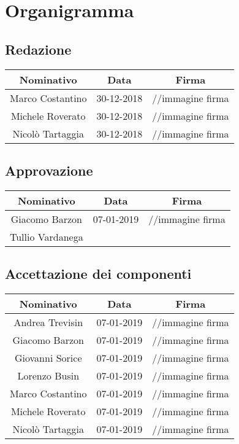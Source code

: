 \section*{Organigramma}

\subsection*{Redazione}
\begin{center}
  \begin{tabular}{ c | c | c }
    \hline
    \textbf{Nominativo} & \textbf{Data} & \textbf{Firma} \\ \hline
    Marco Costantino & 30-12-2018 & //immagine firma \\ \hline
    Michele Roverato & 30-12-2018 & //immagine firma \\ \hline
    Nicolò Tartaggia & 30-12-2018 & //immagine firma \\ 
    \hline
  \end{tabular}
\end{center}

\subsection*{Approvazione}
\begin{center}
  \begin{tabular}{ c | c | c }
    \hline
    \textbf{Nominativo} & \textbf{Data} & \textbf{Firma} \\ \hline
    Giacomo Barzon & 07-01-2019 & //immagine firma \\ \hline
    Tullio Vardanega &  &  \\
    \hline
  \end{tabular}
\end{center}

\subsection*{Accettazione dei componenti}
\begin{center}
  \begin{tabular}{ c | c | c }
    \hline
    \textbf{Nominativo} & \textbf{Data} & \textbf{Firma} \\ \hline
    Andrea Trevisin & 07-01-2019 & //immagine firma \\ \hline
    Giacomo Barzon & 07-01-2019 & //immagine firma \\ \hline
    Giovanni Sorice & 07-01-2019 & //immagine firma \\ \hline
    Lorenzo Busin & 07-01-2019 & //immagine firma \\ \hline
    Marco Costantino & 07-01-2019 & //immagine firma \\ \hline
    Michele Roverato & 07-01-2019 & //immagine firma \\ \hline
    Nicolò Tartaggia & 07-01-2019 & //immagine firma \\ 
    \hline
  \end{tabular}
\end{center}

